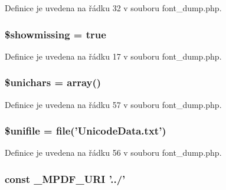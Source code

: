 Definice je uvedena na řádku 32 v souboru font\-\_\-dump.\-php.

\hypertarget{font__dump_8php_a78088e1469eb7590d2db044605ed9875}{
\subsubsection[{\$showmissing}]{\setlength{\rightskip}{0pt plus 5cm}\$showmissing = true}}\label{font__dump_8php_a78088e1469eb7590d2db044605ed9875}


Definice je uvedena na řádku 17 v souboru font\-\_\-dump.\-php.

\hypertarget{font__dump_8php_ab216a6d320faf1beba59f97c9941d866}{
\subsubsection[{\$unichars}]{\setlength{\rightskip}{0pt plus 5cm}\$unichars = array()}}\label{font__dump_8php_ab216a6d320faf1beba59f97c9941d866}


Definice je uvedena na řádku 57 v souboru font\-\_\-dump.\-php.

\hypertarget{font__dump_8php_abaa85dced3638e9abc7f47111f04df8e}{
\subsubsection[{\$unifile}]{\setlength{\rightskip}{0pt plus 5cm}\$unifile = file('Unicode\-Data.\-txt')}}\label{font__dump_8php_abaa85dced3638e9abc7f47111f04df8e}


Definice je uvedena na řádku 56 v souboru font\-\_\-dump.\-php.

\hypertarget{font__dump_8php_a1ff50e3d84f8270d034f2e9d99c147c0}{
\subsubsection[{\-\_\-\-M\-P\-D\-F\-\_\-\-U\-R\-I}]{\setlength{\rightskip}{0pt plus 5cm}const \-\_\-\-M\-P\-D\-F\-\_\-\-U\-R\-I '../'}}\label{font__dump_8php_a1ff50e3d84f8270d034f2e9d99c147c0}


